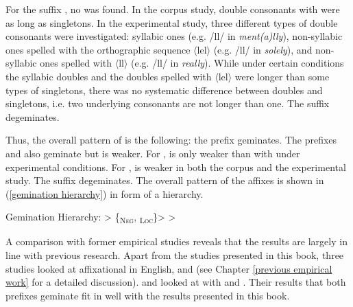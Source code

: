 For the suffix , no  was found. In the corpus study, double consonants with  were as long as singletons. In the experimental study, three different types of double consonants were investigated: syllabic ones (e.g. /ll/ in  \textit{ment(a)lly}), non-syllabic ones spelled with the orthographic sequence $\langle$lel$\rangle$ (e.g. /ll/ in \textit{solely}), and non-syllabic ones spelled with $\langle$ll$\rangle$ (e.g. /ll/ in \textit{really}). While under certain conditions the syllabic doubles and the doubles spelled with $\langle$lel$\rangle$ were longer than some types of singletons, there was no systematic difference between doubles and singletons, i.e. two underlying consonants are not longer than one. The suffix  degeminates.\largerpage



Thus, the overall pattern of  is the following: the prefix  geminates. The prefixes  and   also geminate but  is weaker. For ,  is only weaker than  with  under experimental conditions. For ,  is weaker in both the corpus and the experimental study. The suffix  degeminates. The overall  pattern of the affixes is shown in (\ref{gemination hierarchy}) in form of a hierarchy.


\begin{exe}
	
	\ex \label{gemination hierarchy} {Gemination Hierarchy}: \hspace*{0.5cm}	{ > \{\textsubscript{\textsc{Neg}},  \textsubscript{\textsc{Loc}}\}>  > }
	
\end{exe}


A comparison with former empirical studies reveals that the results are largely in line with previous research. 
Apart from the studies presented in this book, three studies looked at affixational  in English, \cite{Kaye.2005,Oh.2012} and \cite{Kotzor.2016} (see Chapter \ref{previous empirical work} for a detailed discussion). 
\cite{Kaye.2005} and \cite{Oh.2012} looked at  with  and . Their results that both prefixes geminate fit in well with the results presented in this book.


